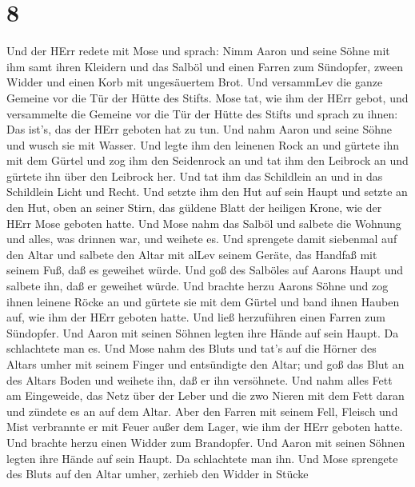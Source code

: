 \hypertarget{section-7}{%
\section{8}\label{section-7}}

 Und der HErr redete mit Mose und sprach:  Nimm
Aaron und seine Söhne mit ihm samt ihren Kleidern und das Salböl und
einen Farren zum Sündopfer, zween Widder und einen Korb mit ungesäuertem
Brot.  Und versammLev die ganze Gemeine vor die Tür der
Hütte des Stifts.  Mose tat, wie ihm der HErr gebot, und
versammelte die Gemeine vor die Tür der Hütte des Stifts 
und sprach zu ihnen: Das ist's, das der HErr geboten hat zu tun.
 Und nahm Aaron und seine Söhne und wusch sie mit Wasser.
 Und legte ihm den leinenen Rock an und gürtete ihn mit dem
Gürtel und zog ihm den Seidenrock an und tat ihm den Leibrock an und
gürtete ihn über den Leibrock her.  Und tat ihm das
Schildlein an und in das Schildlein Licht und Recht.  Und
setzte ihm den Hut auf sein Haupt und setzte an den Hut, oben an seiner
Stirn, das güldene Blatt der heiligen Krone, wie der HErr Mose geboten
hatte.  Und Mose nahm das Salböl und salbete die Wohnung
und alles, was drinnen war, und weihete es.  Und sprengete
damit siebenmal auf den Altar und salbete den Altar mit alLev seinem
Geräte, das Handfaß mit seinem Fuß, daß es geweihet würde. 
Und goß des Salböles auf Aarons Haupt und salbete ihn, daß er geweihet
würde.  Und brachte herzu Aarons Söhne und zog ihnen
leinene Röcke an und gürtete sie mit dem Gürtel und band ihnen Hauben
auf, wie ihm der HErr geboten hatte.  Und ließ herzuführen
einen Farren zum Sündopfer. Und Aaron mit seinen Söhnen legten ihre
Hände auf sein Haupt.  Da schlachtete man es. Und Mose nahm
des Bluts und tat's auf die Hörner des Altars umher mit seinem Finger
und entsündigte den Altar; und goß das Blut an des Altars Boden und
weihete ihn, daß er ihn versöhnete.  Und nahm alles Fett am
Eingeweide, das Netz über der Leber und die zwo Nieren mit dem Fett
daran und zündete es an auf dem Altar.  Aber den Farren mit
seinem Fell, Fleisch und Mist verbrannte er mit Feuer außer dem Lager,
wie ihm der HErr geboten hatte.  Und brachte herzu einen
Widder zum Brandopfer. Und Aaron mit seinen Söhnen legten ihre Hände auf
sein Haupt.  Da schlachtete man ihn. Und Mose sprengete des
Bluts auf den Altar umher,  zerhieb den Widder in Stücke

